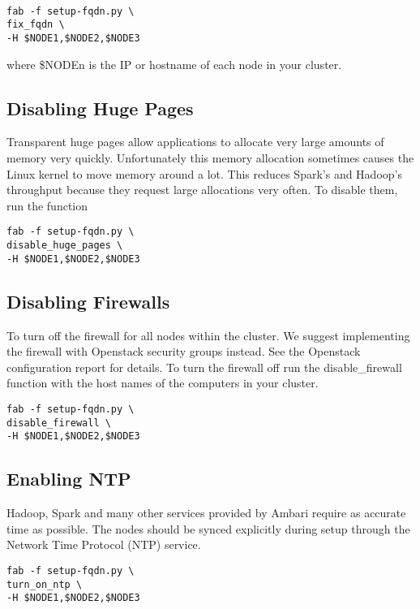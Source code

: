 \documentclass[9pt,twocolumn,twoside]{idsi}
\begin{document}
\begin{verbatim}

fab -f setup-fqdn.py \
fix_fqdn \
-H $NODE1,$NODE2,$NODE3

\end{verbatim}

where \$NODEn is the IP or hostname of each node in your cluster.

\subsection{Disabling Huge Pages}
Transparent huge pages allow applications to allocate very large amounts of memory very quickly. Unfortunately this memory allocation sometimes causes the Linux kernel to move memory around a lot. This reduces Spark's and Hadoop's throughput because they request large allocations very often. To disable them, run the  function

\begin{verbatim}
fab -f setup-fqdn.py \
disable_huge_pages \
-H $NODE1,$NODE2,$NODE3
\end{verbatim}

\subsection{Disabling Firewalls}

To turn off the firewall for all nodes within the cluster. We suggest implementing the firewall with Openstack security groups instead. See the Openstack configuration report for details. To turn the firewall off run the disable\_firewall function with the host names of the computers in your cluster.

\begin{verbatim}
fab -f setup-fqdn.py \
disable_firewall \
-H $NODE1,$NODE2,$NODE3
\end{verbatim}

\subsection{Enabling NTP}
Hadoop, Spark and many other services provided by Ambari require as accurate time as possible.  The nodes should be synced explicitly during setup through the Network Time Protocol (NTP) service. 

\begin{verbatim}
fab -f setup-fqdn.py \
turn_on_ntp \
-H $NODE1,$NODE2,$NODE3
\end{verbatim}
\end{document}
